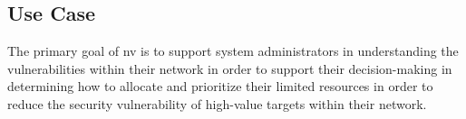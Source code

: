\documentclass{acm_proc_article-sp}
\begin{document}



\subsection{Use Case}

% 


The primary goal of nv is to support system administrators in understanding the
vulnerabilities within their network in order to support their
decision-making in determining how to allocate and prioritize their
limited resources in order to reduce the security vulnerability of
high-value targets within their network.
\end{document}
